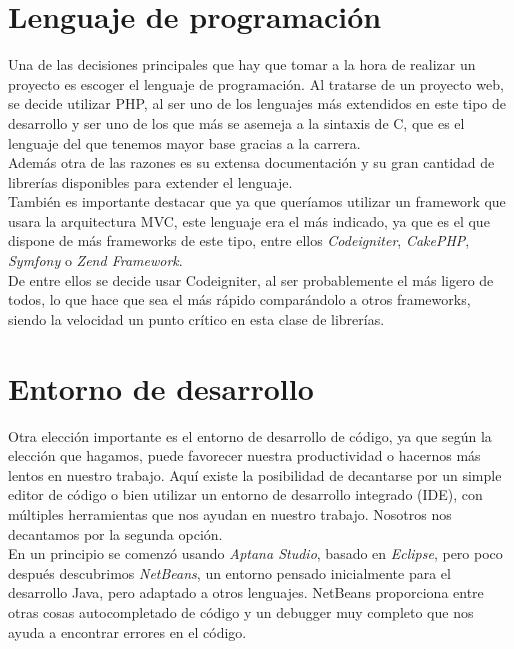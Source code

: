 \section{Lenguaje de programación}

Una de las decisiones principales que hay que tomar a la hora de realizar un proyecto es escoger el lenguaje de programación. Al tratarse de un proyecto web, se decide utilizar PHP, al ser uno de los lenguajes más extendidos en este tipo de desarrollo y ser uno de los que más se asemeja a la sintaxis de C, que es el lenguaje del que tenemos mayor base gracias a la carrera.\\

Además otra de las razones es su extensa documentación y su gran cantidad de librerías disponibles para extender el lenguaje.\\

También es importante destacar que ya que queríamos utilizar un framework que usara la arquitectura MVC, este lenguaje era el más indicado, ya que es el que dispone de más frameworks de este tipo, entre ellos {\em Codeigniter}, {\em CakePHP}, {\em Symfony} o {\em Zend Framework}.\\

De entre ellos se decide usar Codeigniter, al ser probablemente el más ligero de todos, lo que hace que sea el más rápido comparándolo a otros frameworks, siendo la velocidad un punto crítico en esta clase de librerías. 

\section{Entorno de desarrollo}

Otra elección importante es el entorno de desarrollo de código, ya que según la elección que hagamos, puede favorecer nuestra productividad o hacernos más lentos en nuestro trabajo. Aquí existe la posibilidad de decantarse por un simple editor de código o bien utilizar un entorno de desarrollo integrado (IDE), con múltiples herramientas que nos ayudan en nuestro trabajo. Nosotros nos decantamos por la segunda opción.
\\
En un principio se comenzó usando {\em Aptana Studio}, basado en {\em Eclipse}, pero poco después descubrimos {\em NetBeans}, un entorno pensado inicialmente para el desarrollo Java, pero adaptado a otros lenguajes. NetBeans proporciona entre otras cosas autocompletado de código y un debugger muy completo que nos ayuda a encontrar errores en el código.

